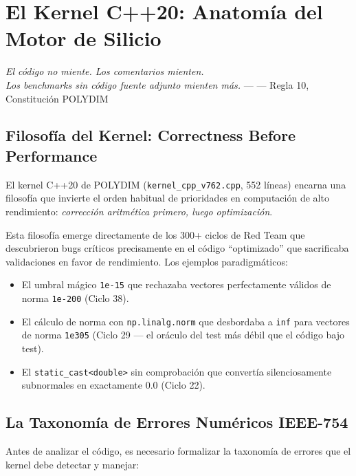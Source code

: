 \chapter{El Kernel C++20: Anatomía del Motor de Silicio}


\textit{El código no miente. Los comentarios mienten.\\
Los benchmarks sin código fuente adjunto mienten más.} --- --- Regla 10, Constitución POLYDIM

\section{Filosofía del Kernel: Correctness Before Performance}

El kernel C++20 de POLYDIM (\texttt{kernel\_cpp\_v762.cpp}, 552 líneas) encarna
una filosofía que invierte el orden habitual de prioridades en computación de alto
rendimiento: \textit{corrección aritmética primero, luego optimización}.

Esta filosofía emerge directamente de los 300+ ciclos de Red Team que descubrieron
bugs críticos precisamente en el código ``optimizado'' que sacrificaba validaciones
en favor de rendimiento. Los ejemplos paradigmáticos:

\begin{itemize}
\item El umbral mágico \texttt{1e-15} que rechazaba vectores perfectamente válidos
de norma \texttt{1e-200} (Ciclo 38).
\item El cálculo de norma con \texttt{np.linalg.norm} que desbordaba a \texttt{inf}
para vectores de norma \texttt{1e305} (Ciclo 29 --- el oráculo del test más débil
que el código bajo test).
\item El \texttt{static\_cast<double>} sin comprobación que convertía silenciosamente
subnormales en exactamente 0.0 (Ciclo 22).
\end{itemize}

\section{La Taxonomía de Errores Numéricos IEEE-754}

Antes de analizar el código, es necesario formalizar la taxonomía de errores que
el kernel debe detectar y manejar:

